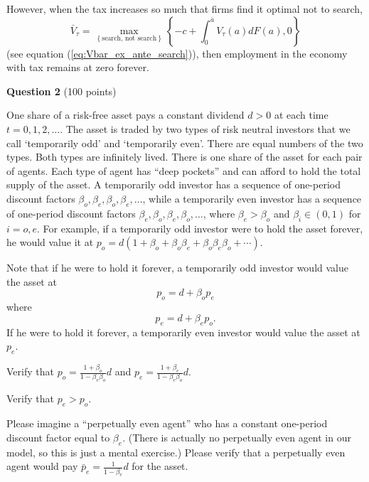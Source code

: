 \documentclass[11pt]{article}
\newenvironment{question}[1][Question]{}{}
\newenvironment{answer}[1][Answer]{}{}
\begin{document}
\begin{question}
\begin{answer}
However, when the tax increases so much that firms find it optimal not to
search,%
\begin{equation*}
\bar{V}_{\tau }=\max_{\left\{ \text{search, not search}\right\} }\left\{
-c+\int_{0}^{\bar{a}}V_{\tau }\left( a\right) dF\left( a\right) ,0\right\}
\end{equation*}
(see equation (\ref{eq:Vbar_ex_ante_search})), then employment in the
economy with tax remains at zero forever.
\end{answer}
\end{question}



\newpage


\noindent \textbf{Question 2} (100 points)\medskip


\noindent One share of a risk-free asset pays a constant dividend $d >0$ at each time $t = 0, 1, 2, \ldots$.
The asset is traded by two types of risk neutral investors that we call  `temporarily odd' and `temporarily even'. There are equal numbers of the two types.
Both types are infinitely lived.  There is one share of the asset for each pair of agents.  Each type of agent has ``deep pockets'' and can afford to hold the total supply of the asset.
A temporarily odd investor
has a sequence of one-period discount factors $\beta_o, \beta_e, \beta_o, \beta_e, \ldots $, while a temporarily  even investor
has a sequence of one-period discount factors   $\beta_e, \beta_o, \beta_e,  \beta_o, \ldots $, where $\beta_e > \beta_o$
and $\beta_i \in (0,1)$ for $i=o, e$. For example, if a temporarily odd investor were to hold the asset forever, he would value
it at $p_o = d( 1 + \beta_o + \beta_o \beta_e + \beta_o \beta_e \beta_o + \cdots )$.

\medskip
{}

\medskip
\noindent   Note that if he were to hold it forever, a temporarily odd investor would value the asset at
$$ p_o = d + \beta_o p_e$$
where
$$ p_e = d + \beta_e p_o .$$
If he were to hold it forever, a temporarily even investor would value the asset at
$p_e$.

\medskip
{} Verify that $p_o = {\frac{1 + \beta_o}{1-\beta_e \beta_o}} d $ and
$ p_e = {\frac{1 + \beta_e}{1-\beta_e \beta_o}} d $.

\medskip
{} Verify that $p_e > p_o$.


\medskip
{} Please imagine a  ``perpetually even agent'' who has a constant one-period discount factor equal to
$\beta_e$.  (There is actually no perpetually even agent in our model, so this is just a mental exercise.)  Please verify
that a perpetually even agent would pay $\bar p_e = {\frac{1}{1-\beta_e}}d $ for the asset.
\end{document}
